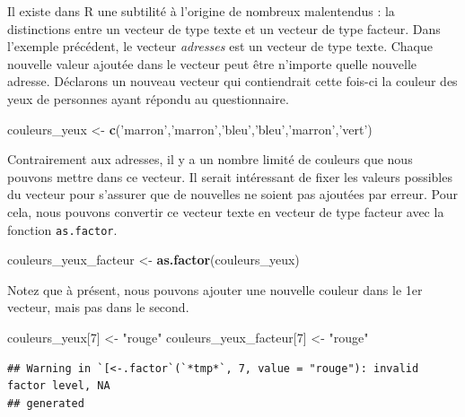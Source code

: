 \documentclass[
  11pt,
  french,
]{book}
\makeatletter
\newenvironment{Shaded}{\begin{snugshade}}{\end{snugshade}}
\newcommand{\DecValTok}[1]{\textcolor[rgb]{0.00,0.00,0.81}{#1}}
\newcommand{\KeywordTok}[1]{\textcolor[rgb]{0.13,0.29,0.53}{\textbf{#1}}}
\newcommand{\NormalTok}[1]{#1}
\newcommand{\StringTok}[1]{\textcolor[rgb]{0.31,0.60,0.02}{#1}}
\newenvironment{kframe}{%
\medskip{}
\setlength{\fboxsep}{.8em}
 \def\at@end@of@kframe{}%
 \ifinner\ifhmode%
  \def\at@end@of@kframe{\end{minipage}}%
  \begin{minipage}{\columnwidth}%
 \fi\fi%
 \def\FrameCommand##1{\hskip\@totalleftmargin \hskip-\fboxsep
 \colorbox{shadecolor}{##1}\hskip-\fboxsep
     \hskip-\linewidth \hskip-\@totalleftmargin \hskip\columnwidth}%
 \MakeFramed {\advance\hsize-\width
   \@totalleftmargin\z@ \linewidth\hsize
   \@setminipage}}%
 {\par\unskip\endMakeFramed%
 \at@end@of@kframe}
\newenvironment{kframev}{%
\medskip{}
\setlength{\fboxsep}{.8em}
 \def\at@end@of@kframev{}%
 \ifinner\ifhmode%
  \def\at@end@of@kframev{\end{minipage}}%
  \begin{minipage}{\columnwidth}%
 \fi\fi%
 \def\FrameCommand##1{\hskip\@totalleftmargin \hskip-\fboxsep
 \colorbox{shadebluecolor}{##1}\hskip-\fboxsep
     \hskip-\linewidth \hskip-\@totalleftmargin \hskip\columnwidth}%
 \MakeFramed {\advance\hsize-\width
   \@totalleftmargin\z@ \linewidth\hsize
   \@setminipage}}%
 {\par\unskip\endMakeFramed%
 \at@end@of@kframev}
\renewenvironment{Shaded}{\begin{kframe}}{\end{kframe}}
\newenvironment{rmdblock}[1]
  {
  \begin{itemize}
  \renewcommand{\labelitemi}{
    \raisebox{-.7\height}[0pt][0pt]{
      {\setkeys{Gin}{width=3em,keepaspectratio}\texttt{[image: images/\#1]}}
    }
  }
  \setlength{\fboxsep}{1em}
  \begin{kframev}
  \small
  \item
  }
  {
  \end{kframev}
  \end{itemize}
  }
\newenvironment{bloc_attention}
  {\begin{rmdblock}{attention}}
  {\end{rmdblock}}
\makeatother
\begin{document}
\begin{bloc_attention}

Il existe dans R une subtilité à l'origine de nombreux malentendus : la distinctions entre un vecteur de type texte et un vecteur de type facteur. Dans l'exemple précédent, le vecteur \emph{adresses} est un vecteur de type texte. Chaque nouvelle valeur ajoutée dans le vecteur peut être n'importe quelle nouvelle adresse. Déclarons un nouveau vecteur qui contiendrait cette fois-ci la couleur des yeux de personnes ayant répondu au questionnaire.

\begin{Shaded}
\begin{Highlighting}[]
\NormalTok{couleurs_yeux <-}\StringTok{ }\KeywordTok{c}\NormalTok{(}\StringTok{'marron'}\NormalTok{,}\StringTok{'marron'}\NormalTok{,}\StringTok{'bleu'}\NormalTok{,}\StringTok{'bleu'}\NormalTok{,}\StringTok{'marron'}\NormalTok{,}\StringTok{'vert'}\NormalTok{)}
\end{Highlighting}
\end{Shaded}

Contrairement aux adresses, il y a un nombre limité de couleurs que nous pouvons mettre dans ce vecteur. Il serait intéressant de fixer les valeurs possibles du vecteur pour s'assurer que de nouvelles ne soient pas ajoutées par erreur. Pour cela, nous pouvons convertir ce vecteur texte en vecteur de type facteur avec la fonction \texttt{as.factor}.

\begin{Shaded}
\begin{Highlighting}[]
\NormalTok{couleurs_yeux_facteur <-}\StringTok{ }\KeywordTok{as.factor}\NormalTok{(couleurs_yeux)}
\end{Highlighting}
\end{Shaded}

Notez que à présent, nous pouvons ajouter une nouvelle couleur dans le 1er vecteur, mais pas dans le second.

\begin{Shaded}
\begin{Highlighting}[]
\NormalTok{couleurs_yeux[}\DecValTok{7}\NormalTok{] <-}\StringTok{ "rouge"}
\NormalTok{couleurs_yeux_facteur[}\DecValTok{7}\NormalTok{] <-}\StringTok{ "rouge"}
\end{Highlighting}
\end{Shaded}

\begin{verbatim}
## Warning in `[<-.factor`(`*tmp*`, 7, value = "rouge"): invalid factor level, NA
## generated
\end{verbatim}


\end{bloc_attention}
\end{document}
